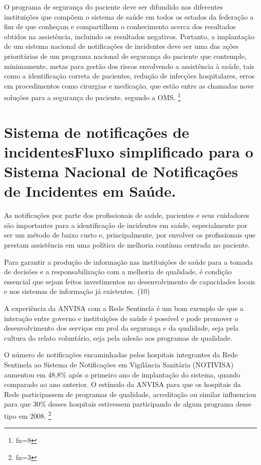 \documentclass{article}
\makeatletter
\newcommand{\fn}{\afterassignment\fn@aux\count0=}
\newcommand{\fn@aux}{\csname fn\the\count0\endcsname}
\makeatother
\begin{document}
O programa de segurança do paciente deve ser difundido nas diferentes
instituições que
compõem o sistema de saúde em todos os estados da federação a fim de que
conheçam e
compartilhem o conhecimento acerca dos resultados obtidos na assistência,
incluindo os
resultados negativos. Portanto, a implantação de um sistema nacional de
notificações de
incidentes deve ser uma das ações prioritárias de um programa nacional de
segurança do
paciente que contemple, minimamente, metas para gestão dos riscos envolvendo a
assistência à
saúde, tais como a identificação correta de pacientes, redução de infecções
hospitalares,
erros em procedimentos como cirurgias e medicação, que estão entre as chamadas
nove soluções
para a segurança do paciente, segundo a OMS. \footnote{\fn8}

\section{Sistema de notificações de incidentesFluxo simplificado para o Sistema
Nacional de Notificações de Incidentes em
Saúde.}

As notificações por parte dos profissionais de saúde, pacientes e seus
cuidadores são
importantes para a identificação de incidentes em saúde, especialmente por ser
um método de
baixo custo e, principalmente, por envolver os profissionais que prestam
assistência em uma
política de melhoria contínua centrada no paciente.

Para garantir a produção de informação nas instituições de saúde para a tomada
de decisões
e a responsabilização com a melhoria de qualidade, é condição essencial que
sejam feitos
investimentos no desenvolvimento de capacidades locais e nos sistemas de
informação já
existentes. (10)

A experiência da ANVISA com a Rede Sentinela é um bom exemplo de que a interação
entre
governo e instituições de saúde é possível e pode promover o desenvolvimento dos
serviços em
prol da segurança e da qualidade, seja pela cultura do relato voluntário, seja
pela adesão
aos programas de qualidade.

O número de notificações encaminhadas pelos hospitais integrantes da Rede
Sentinela ao
Sistema de Notificações em Vigilância Sanitária (NOTIVISA) aumentou em 48,8\%
após o primeiro
ano de implantação do sistema, quando comparado ao ano anterior. O estímulo da
ANVISA para
que os hospitais da Rede participassem de programas de qualidade, acreditação ou
similar
influenciou para que 30\% desses hospitais estivessem participando de algum
programa desse
tipo em 2008. \footnote{\fn3}
\end{document}

